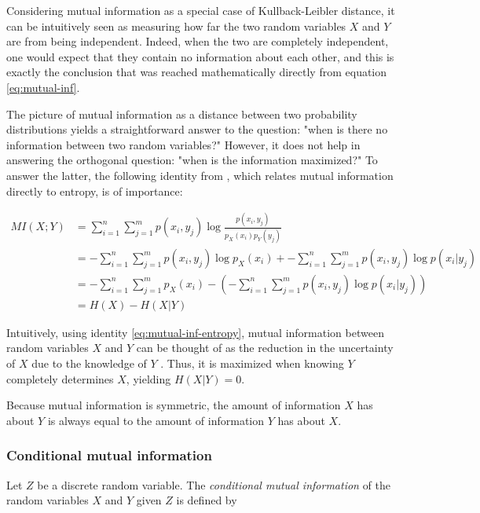 \documentclass[12pt]{article}
\begin{document}
Considering mutual information as a special case of Kullback-Leibler distance, it can be intuitively seen as measuring how far the two random variables $X$ and $Y$ are from being independent. Indeed, when the two are completely independent, one would expect that they contain no information about each other, and this is exactly the conclusion that was reached mathematically directly from equation \ref{eq:mutual-inf}.

The picture of mutual information as a distance between two probability distributions yields a straightforward answer to the question: "when is there no information between two random variables?" However, it does not help in answering the orthogonal question: "when is the information maximized?" To answer the latter, the following identity from \cite{cover-thomas}, which relates mutual information directly to entropy, is of importance: 

\begin{equation}
\begin{split}
MI(X;Y) & = \sum_{i=1}^n \sum_{j=1}^m p(x_i,y_j) \log \frac{p(x_i,y_j)}{p_X(x_i)p_Y(y_j)} \\
 		& = -\sum_{i=1}^n \sum_{j=1}^m p(x_i,y_j) \log p_X(x_i) + -\sum_{i=1}^n \sum_{j=1}^m p(x_i,y_j) \log p(x_i|y_j) \\
 		& = -\sum_{i=1}^n \sum_{j=1}^m p_X(x_i) - \left( - \sum_{i=1}^n \sum_{j=1}^m p(x_i,y_j) \log p(x_i|y_j) \right) \\ 
 		& = H(X) - H(X|Y)
\label{eq:mutual-inf-entropy} 
\end{split}
\end{equation}

Intuitively, using identity \ref{eq:mutual-inf-entropy}, mutual information between random variables $X$ and $Y$ can be thought of as the reduction in the uncertainty of $X$ due to the knowledge of $Y$ \cite{cover-thomas}. Thus, it is maximized when knowing $Y$ completely determines $X$, yielding $H(X|Y) = 0$. 

Because mutual information is symmetric, the amount of information $X$ has about $Y$ is always equal to the amount of information $Y$ has about $X$. 

\subsubsection{Conditional mutual information}

Let $Z$ be a discrete random variable. The \textit{conditional mutual information} \cite{cover-thomas} of the random variables $X$ and $Y$ given $Z$ is defined by 
\end{document}
